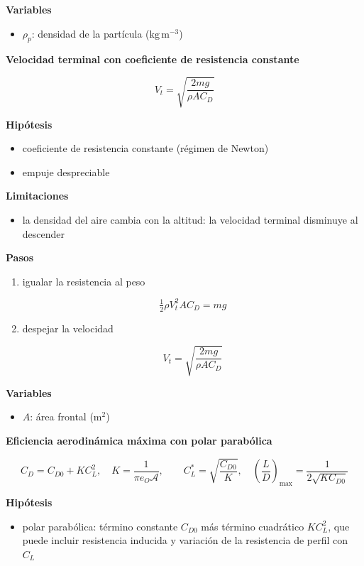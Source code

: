 \documentclass[10pt,openany]{book}
\begin{document}
\begin{tcolorbox}[title={Desarrollos del modelo}, studiumdef, breakable]
\noindent\textbf{Variables}
\begin{itemize}
\item $\rho_{p}$: densidad de la partícula ($\mathrm{kg}\,\mathrm{m}^{-3}$)
\end{itemize}



\noindent\textbf{Velocidad terminal con coeficiente de resistencia constante}

\[
V_t = \sqrt{\frac{2 m g}{\rho A C_D}}
\]

\noindent\textbf{Hipótesis}
\begin{itemize}
\item coeficiente de resistencia constante (régimen de Newton)
\item empuje despreciable
\end{itemize}

\noindent\textbf{Limitaciones}
\begin{itemize}
\item la densidad del aire cambia con la altitud: la velocidad terminal disminuye al descender
\end{itemize}

\noindent\textbf{Pasos}
\begin{enumerate}
\item
igualar la resistencia al peso

\[
\tfrac12\rho V_t^{2} A C_D = m g
\]
\item
despejar la velocidad

\[
V_t = \sqrt{\frac{2 m g}{\rho A C_D}}
\]
\end{enumerate}

\noindent\textbf{Variables}
\begin{itemize}
\item $A$: área frontal ($\mathrm{m}^{2}$)
\end{itemize}



\noindent\textbf{Eficiencia aerodinámica máxima con polar parabólica}

\[
C_D = C_{D0} + K C_L^{2},\quad K = \frac{1}{\pi e_O\mathcal{A}},\qquad C_L^{*} = \sqrt{\frac{C_{D0}}{K}},\quad \left(\frac{L}{D}\right)_{\max} = \frac{1}{2\sqrt{K C_{D0}}}
\]

\noindent\textbf{Hipótesis}
\begin{itemize}
\item polar parabólica: término constante \(C_{D0}\) más término cuadrático \(K C_L^2\), que puede incluir resistencia inducida y variación de la resistencia de perfil con \(C_L\)
\end{itemize}


\end{tcolorbox}
\end{document}
